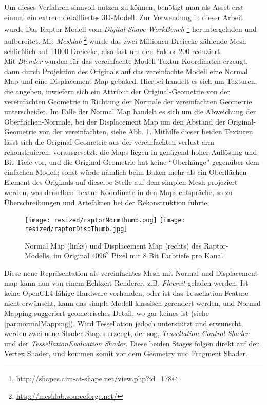 	Um dieses Verfahren sinnvoll nutzen zu können, benötigt man als Asset erst einmal ein extrem detailliertes 3D-Modell.
	Zur Verwendung in dieser Arbeit wurde Das Raptor-Modell vom \emph{Digital Shape WorkBench} 
	\footnote{\url{http://shapes.aim-at-shape.net/view.php?id=178}} heruntergeladen
	und aufbereitet. Mit \emph{Meshlab} \footnote{\url{http://meshlab.sourceforge.net/}} wurde das
	zwei Millionen Dreiecke zählende Mesh schließlich auf 11000 Dreiecke, also fast um den Faktor 200
	reduziert.\\
	Mit \emph{Blender} wurden für das vereinfachte Modell Textur-Koordinaten erzeugt,
	dann durch Projektion des Originals auf das vereinfachte Modell
	eine Normal Map und eine Displacement Map gebaked.
	Hierbei handelt es sich um Texturen, die angeben, inwiefern sich ein Attribut der
	Original-Geometrie von der vereinfachten Geometrie in Richtung der Normale der vereinfachten 
	Geometrie unterscheidet. Im Falle der Normal Map
	handelt es sich um die Abweichung der Oberflächen-Normale, bei der Displacement Map um den
	Abstand der Original-Geometrie von der vereinfachten, siehe Abb. \ref{fig:normalDisp}. 
	Mithilfe dieser beiden Texturen lässt sich
	die Original-Geometrie aus der vereinfachten verlust-arm rekonstruieren, vorausgesetzt, die Maps
	liegen in genügend hoher Auflösung und Bit-Tiefe vor, und die Original-Geometrie hat keine "`Überhänge"'
	gegenüber dem einfachen Modell; sonst würde nämlich beim Baken mehr als ein Oberflächen-Element des Originals
	auf dieselbe Stelle auf dem simplen Mesh projeziert werden, was derselben Textur-Koordinate in den
	Maps entspräche, so zu Überschreibungen und Artefakten bei der Rekonstruktion führte.\\
	
	\begin{figure}[!h]
		\texttt{[image: resized/raptorNormThumb.png]}
		\texttt{[image: resized/raptorDispThumb.jpg]}
		\caption{Normal Map (links) und Displacement Map (rechts) des Raptor-Modells, im Original $4096^2$ Pixel
		mit 8 Bit Farbtiefe pro Kanal}
		\label{fig:normalDisp}
	\end{figure}
	
	Diese neue Repräsentation als vereinfachtes Mesh mit Normal und Displacement map kann nun
	von einem Echtzeit-Renderer, z.B. \emph{Flewnit} geladen werden. Ist keine OpenGL4-fähige Hardware vorhanden, 
	oder ist das Tessellation-Feature nicht erwünscht, kann das simple Modell klassisch gerendert werden,
	und Normal Mapping suggeriert geometrisches Detail, wo gar keines ist (siehe \ref{par:normalMapping}).
	Wird Tessellation jedoch unterstützt und erwünscht, werden zwei neue Shader-Stages erzeugt,
	der sog. \emph{Tessellation Control Shader} und der \emph{TessellationEvaluation Shader}.
	Diese beiden Stages folgen direkt auf den Vertex Shader, und kommen somit vor dem  Geometry
	und Fragment Shader.\\
	
